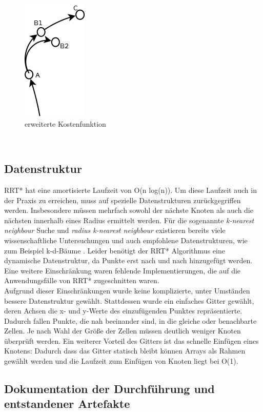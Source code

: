 \begin{figure}
\centering
 \includegraphics[scale=1]{Bilder/B1Insert.png}
 \caption{erweiterte Kostenfunktion}
 \label{fig2}
\end{figure}\

\subsection{Datenstruktur}
RRT* hat eine amortisierte Laufzeit von O(n log(n)). Um diese Laufzeit auch in der Praxis zu erreichen, muss auf spezielle Datenstrukturen zurückgegriffen werden. Insbesondere müssen mehrfach sowohl der nächste Knoten als auch die nächsten innerhalb eines Radius ermittelt werden. Für die sogenannte \textit{k-nearest neighbour} Suche und \textit{radius k-nearest neighbour} existieren bereits viele wissenschaftliche Untersuchungen und auch empfohlene Datenstrukturen, wie zum Beispiel k-d-Bäume \citep{Bentley75}. Leider benötigt der RRT* Algorithmus eine dynamische Datenstruktur, da Punkte erst nach und nach hinzugefügt werden. Eine weitere Einschränkung waren fehlende Implementierungen, die auf die Anwendungsfälle von RRT* zugeschnitten waren. \\
Aufgrund dieser Einschränkungen wurde keine komplizierte, unter Umständen bessere Datenstruktur gewählt. Stattdessen wurde ein einfaches Gitter gewählt, deren Achsen die x- und y-Werte des einzufügenden Punktes repräsentierte. Dadurch fallen Punkte, die nah beeinander sind, in die gleiche oder benachbarte Zellen. Je nach Wahl der Größe der Zellen müssen deutlich weniger Knoten überprüft werden. Ein weiterer Vorteil des Gitters ist das schnelle Einfügen eines Knotens: Dadurch dass das Gitter statisch bleibt können Arrays als Rahmen gewählt werden und die Laufzeit zum Einfügen von Knoten liegt bei O(1).



\subsection{Dokumentation der Durchführung und entstandener Artefakte}
